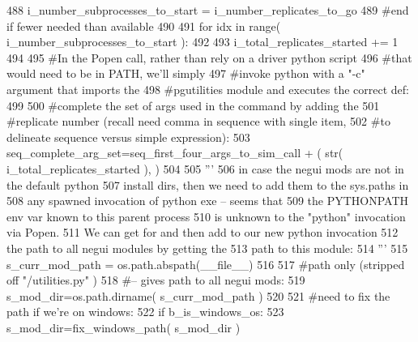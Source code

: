 \begin{DoxyCode}
488                     i\_number\_subprocesses\_to\_start = i\_number\_replicates\_to\_go
489             \textcolor{comment}{#end if fewer needed than available}
490 
491             \textcolor{keywordflow}{for} idx \textcolor{keywordflow}{in} range( i\_number\_subprocesses\_to\_start ):
492 
493                 i\_total\_replicates\_started += 1
494                 
495                 \textcolor{comment}{#In the Popen call, rather than rely on a driver python script }
496                 \textcolor{comment}{#that would need to be in PATH, we'll simply}
497                 \textcolor{comment}{#invoke python with a "-c" argument that imports the }
498                 \textcolor{comment}{#pgutilities module and executes the correct def:}
499         
500                 \textcolor{comment}{#complete the set of args used in the command by adding the}
501                 \textcolor{comment}{#replicate number (recall need comma in sequence with single item,}
502                 \textcolor{comment}{#to delineate sequence versus simple expression):}
503                 seq\_complete\_arg\_set=seq\_first\_four\_args\_to\_sim\_call + ( str( i\_total\_replicates\_started ),
       )
504 
505                 \textcolor{stringliteral}{'''}
506 \textcolor{stringliteral}{                in case the negui mods are not in the default python }
507 \textcolor{stringliteral}{                install dirs, then we need to add them to the sys.paths in}
508 \textcolor{stringliteral}{                any  spawned invocation of python exe -- seems that }
509 \textcolor{stringliteral}{                the PYTHONPATH env var known to this parent process }
510 \textcolor{stringliteral}{                is unknown to the "python" invocation via Popen.  }
511 \textcolor{stringliteral}{                We can get for and then add to our new python invocation}
512 \textcolor{stringliteral}{                the path to all negui modules by getting the}
513 \textcolor{stringliteral}{                path to this module:}
514 \textcolor{stringliteral}{                '''}
515                 s\_curr\_mod\_path = os.path.abspath(\_\_file\_\_)
516 
517                 \textcolor{comment}{#path only (stripped off "/utilities.py" )}
518                 \textcolor{comment}{#-- gives path to all negui mods:}
519                 s\_mod\_dir=os.path.dirname( s\_curr\_mod\_path )
520 
521                 \textcolor{comment}{#need to fix the path if we're on windows:}
522                 \textcolor{keywordflow}{if} b\_is\_windows\_os:
523                     s\_mod\_dir=fix\_windows\_path( s\_mod\_dir )

\end{DoxyCode}
